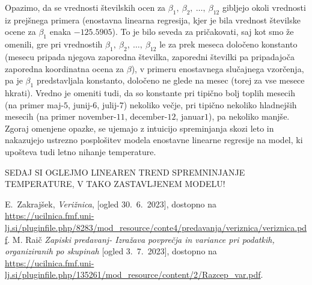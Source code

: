 \documentclass{article}
\begin{document}
Opazimo, da se vrednosti številskih ocen za $\beta_1,~\beta_2,~\dots,~\beta_{12}$ gibljejo okoli vrednosti iz prejšnega primera (enostavna linearna regresija, kjer je bila vrednost številske ocene za $\beta_1$ enaka $-125.5905$). 
To je bilo seveda za pričakovati, saj kot smo že omenili, gre pri vrednostih $\beta_1,~\beta_2,~\dots,~\beta_{12}$ le za prek meseca določeno konstanto (mesecu pripada njegova zaporedna številka, zaporedni številki pa pripadajoča zaporedna koordinatna ocena za $\beta$), v primeru enostavnega slučajnega vzorčenja, pa je $\beta_1$ predstavljala konstanto, določeno ne glede na mesec (torej za vse mesece hkrati). 
Vredno je omeniti tudi, da so konstante pri tipično bolj toplih mesecih (na primer maj-$5$, junij-$6$, julij-$7$) nekoliko večje, pri tipično nekoliko hladnejših mesecih (na primer november-$11$, december-$12$, januar$1$), pa nekoliko manjše.
Zgoraj omenjene opazke, se ujemajo z intuicijo spreminjanja skozi leto in nakazujejo ustrezno posplošitev modela enostavne linearne regresije na model, ki upošteva tudi letno nihanje temperature. 




SEDAJ SI OGLEJMO LINEAREN TREND SPREMNINJANJE TEMPERATURE, V TAKO ZASTAVLJENEM MODELU!


\begin{thebibliography}{9}
        E.~Zakrajšek, \emph{Verižnica}, [ogled 30.~6.~2023], dostopno na \url{https://ucilnica.fmf.uni-lj.si/pluginfile.php/8283/mod_resource/conte4/predavanja/veriznica/veriznica.pdf}.
        M. Raič \emph{Zapiski predavanj- Izražava povprečja in variance pri podatkih, organiziranih po skupinah} [ogled 3.~7.~2023], dostopno na \url{https://ucilnica.fmf.uni-lj.si/pluginfile.php/135261/mod_resource/content/2/Razcep_var.pdf}.
\end{thebibliography}
\end{document}
